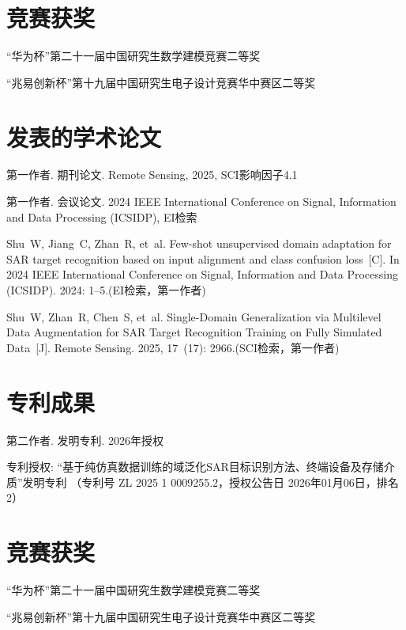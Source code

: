 \begin{resume}
\section*{竞赛获奖}
\begin{enumerate}[label={[\arabic*]},labelsep=6pt,topsep=0pt,partopsep=0pt,
parsep=0pt,itemsep=1pt,leftmargin=0em,itemindent=42pt]
  \item “华为杯”第二十一届中国研究生数学建模竞赛二等奖
  \item “兆易创新杯”第十九届中国研究生电子设计竞赛华中赛区二等奖
\end{enumerate}

\else

\section*{发表的学术论文}
\begin{enumerate}[label={[\arabic*]},labelsep=6pt,topsep=0pt,partopsep=0pt,
parsep=0pt,itemsep=1pt,leftmargin=0em,itemindent=42pt]
  \ifisblind
    \item 第一作者. 期刊论文. Remote Sensing, 2025, SCI影响因子4.1
    \item 第一作者. 会议论文. 2024 IEEE International Conference on Signal, Information and Data Processing (ICSIDP), EI检索
  \else
  \item Shu~W, Jiang~C, Zhan~R, et~al.
  Few-shot unsupervised domain adaptation for SAR target recognition based on input alignment and class confusion loss~[C].
  In 2024 IEEE International Conference on Signal, Information and Data Processing (ICSIDP).
  2024: 1--5.(EI检索，第一作者)
  \item Shu~W, Zhan~R, Chen~S, et~al.
  Single-Domain Generalization via Multilevel Data Augmentation for SAR Target Recognition Training on Fully Simulated Data~[J].
  Remote Sensing.
  2025, 17~(17): 2966.(SCI检索，第一作者)
  \fi
\end{enumerate}

\section*{专利成果}
\begin{enumerate}[label={[\arabic*]},labelsep=6pt,topsep=0pt,partopsep=0pt,
parsep=0pt,itemsep=1pt,leftmargin=0em,itemindent=42pt]
  \ifisblind
    \item 第二作者. 发明专利. 2026年授权
  \else
  \item 专利授权: “基于纯仿真数据训练的域泛化SAR目标识别方法、终端设备及存储介质”发明专利
  （专利号 ZL 2025 1 0009255.2，授权公告日 2026年01月06日，排名2）
  \fi
\end{enumerate}

\section*{竞赛获奖}
\begin{enumerate}[label={[\arabic*]},labelsep=6pt,topsep=0pt,partopsep=0pt,
parsep=0pt,itemsep=1pt,leftmargin=0em,itemindent=42pt]
  \item “华为杯”第二十一届中国研究生数学建模竞赛二等奖
  \item “兆易创新杯”第十九届中国研究生电子设计竞赛华中赛区二等奖
\end{enumerate}

\fi
\fi
\end{resume}
